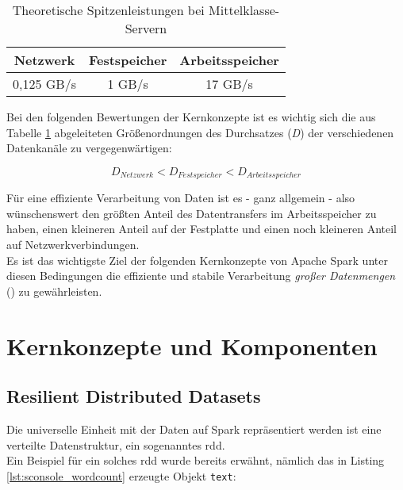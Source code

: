\begin{table}[ht]
	\centering %
	\begin{tabular}{c c c} %
		\hline\hline %
		Netzwerk & Festspeicher & Arbeitsspeicher\\ [0.5ex] %
		\hline %
		0,125 GB/s & 1 GB/s & 17 GB/s \\ %
		\hline %
	\end{tabular}
	\caption{Theoretische Spitzenleistungen bei Mittelklasse-Servern} %
	\label{table:vgldurchsatz} %
\end{table}

Bei den folgenden Bewertungen der Kernkonzepte ist es wichtig sich die aus Tabelle \ref{table:vgldurchsatz} abgeleiteten Größenordnungen des Durchsatzes (\textit{D}) der verschiedenen Datenkanäle zu vergegenwärtigen:

\begin{equation*}
	D_{Netzwerk} < D_{Festspeicher} < D_{Arbeitsspeicher}
\end{equation*}

Für eine effiziente Verarbeitung von Daten ist es - ganz allgemein - also wünschenswert den größten Anteil des Datentransfers im Arbeitsspeicher zu haben, einen kleineren Anteil auf der Festplatte und einen noch kleineren Anteil auf Netzwerkverbindungen.\\

Es ist das wichtigste Ziel der folgenden Kernkonzepte von Apache Spark unter diesen Bedingungen die effiziente und stabile Verarbeitung \textit{großer Datenmengen} (\cite{Sam14}) zu gewährleisten.\\

\section{Kernkonzepte und Komponenten}

\subsection{Resilient Distributed Datasets}
Die universelle Einheit mit der Daten auf Spark repräsentiert werden ist eine verteilte Datenstruktur, ein sogenanntes \gls{rdd}\cite{Mat12}.\\

Ein Beispiel für ein solches \gls{rdd} wurde bereits erwähnt, nämlich das in Listing \ref{lst:sconsole_wordcount} erzeugte Objekt \lstinline|text|:\\

